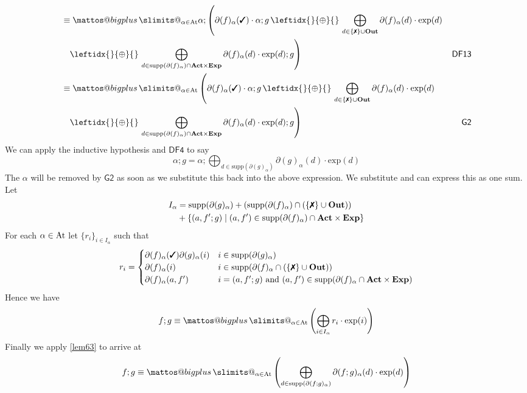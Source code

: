 \documentclass[a4paper,UKenglish,cleveref, autoref, thm-restate]{lipics-v2021}
\makeatletter
\newcommand{\cmark}{\text{\ding{51}}}
\newcommand{\xmark}{\text{\ding{55}}}
\newcommand{\Out}{\textbf{\upshape{Out}}}
\newcommand{\Act}{\textbf{\upshape{Act}}}
\newcommand{\At}{\text{\upshape{At}}}
\newcommand{\Exp}{\textbf{\upshape{Exp}}}
\newcommand{\WC}[2]{\,\leftidx{_{#1}}{{\oplus}}{_{#2}}\,}
\newcommand{\Ax}[1]{\ensuremath{\mathsf{#1}}}
\theoremstyle{plain}\newtheoremrep{thm}{Theorem}[section]
\newcommand{\bigplus}{\DOTSB\mathop{\mathpalette\mattos@bigplus\relax}\slimits@
}
\newcommand\mattos@bigplus[2]{\vcenter{\hbox{\sbox\z@{$#1\sum$}\resizebox{!}{0.9\dimexpr\ht\z@+\dp\z@}{\raisebox{\depth}{$\m@th#1+$}}}}\vphantom{\sum}}
\makeatother
\begin{document}
\begin{appendixproof}
\begin{align*}
		&\equiv \bigplus_{\alpha \in \At} \alpha;\left(\partial(f)_\alpha(\cmark) \cdot \alpha;g \WC{}{}  \bigoplus_{{\substack{d \in \{\xmark\} \cup \Out}}}\partial(f)_\alpha(d) \cdot \text{exp}(d) \right. \\ &\left.\;\; \WC{}{} \bigoplus_{{\substack{d \in \text{supp}(\partial(f)_\alpha)\cap \Act\times\Exp}}}\partial(f)_\alpha(d) \cdot \text{exp}(d);g\right) & \Ax{DF13}\\
		&\equiv \bigplus_{\alpha \in \At} \left(\partial(f)_\alpha(\cmark) \cdot \alpha;g \WC{}{} \bigoplus_{{\substack{d \in \{\xmark\} \cup \Out}}}\partial(f)_\alpha(d) \cdot \text{exp}(d) \right. \\ &\left.\;\;\WC{}{} \bigoplus_{{\substack{d \in \text{supp}(\partial(f)_\alpha)\cap \Act\times\Exp}}}\partial(f)_\alpha(d) \cdot \text{exp}(d);g\right) & \Ax{G2}
	\end{align*}
	We can apply the inductive hypothesis and \Ax{DF4} to say 
	$$\alpha;g = \alpha;\bigoplus_{d\in \text{supp}(\partial(g)_\alpha)}\partial(g)_\alpha(d)\cdot \text{exp}(d)$$ The $\alpha$ will be removed by \Ax{G2} as soon as we substitute this back into the above expression.
	We substitute and can express this as one sum. Let
	\begin{align*}I_\alpha &= \text{supp}(\partial(g)_\alpha)+(\text{supp}(\partial(f)_\alpha)\cap (\{\xmark\} \cup \Out))\\&+\{(a, f^\prime;g) \mid (a,f^\prime) \in \text{supp}(\partial(f)_\alpha) \cap \Act\times\Exp\}\end{align*}
	For each $\alpha \in \At$ let $\{r_i\}_{i\in I_\alpha}$ such that 
	$$ r_i  = \begin{cases}
		\partial(f)_\alpha(\cmark)\partial(g)_\alpha(i)& i\in \text{supp}(\partial(g)_\alpha)\\
		\partial(f)_\alpha(i)&i\in \text{supp}(\partial(f)_\alpha\cap(\{\xmark\} \cup \Out))\\
		\partial(f)_\alpha(a,f^\prime)&i=(a,f^\prime;g) \text{ and } (a,f^\prime) \in \text{supp}(\partial(f)_\alpha \cap \Act\times\Exp)
	\end{cases}$$
	Hence we have
	$$f;g \equiv \bigplus_{\alpha \in \At}\left(\bigoplus_{i \in I_\alpha}r_i \cdot \text{exp}(i)\right)$$
	Finally we apply \cref{lem63} to arrive at
	$$f;g \equiv \bigplus_{\alpha \in \At}\left(\bigoplus_{d \in \text{supp}(\partial(f;g)_\alpha)} \partial(f;g)_\alpha(d) \cdot \text{exp}(d)\right)$$

\end{appendixproof}
\end{document}
